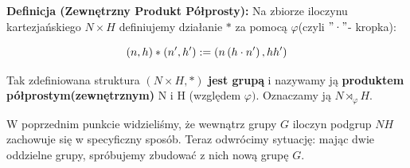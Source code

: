 \begin{goall}
\begin{enumerate}[label=\arabic*.]
\noindent\textbf{Definicja (Zewnętrzny Produkt Półprosty): } Na zbiorze iloczynu kartezjańskiego $N\times H$ definiujemy działanie $*$ za pomocą $\varphi$(czyli $"\cdot "$- kropka): 

\begin{figure}[H]
\centering
\begin{equation*}
	\centering
	\left( n,h \right) * \left( n',h' \right) := \left( n\tikzmark{N}\left( h\tikzmark{HN}\cdot n' \right), h\tikzmark{H}h' \right)   
\end{equation*}
\end{figure}

\vspace{2em}

Tak zdefiniowana struktura $\left( N\times H, * \right) $ \textbf{jest grupą} i nazywamy ją \textbf{produktem półprostym(zewnętrznym)} N i H (względem $\varphi)$. Oznaczamy ją $N\rtimes_{\varphi}H$. 

\end{enumerate}
\end{goall}
\begin{context}
W poprzednim punkcie widzieliśmy, że wewnątrz grupy $G$ iloczyn podgrup $NH$ zachowuje się w specyficzny sposób. Teraz odwrócimy sytuację: mając dwie oddzielne grupy, spróbujemy zbudować z nich nową grupę $G$.
\end{context}

